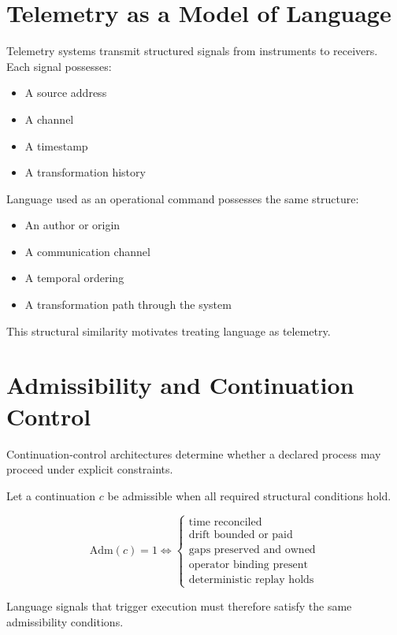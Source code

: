 \documentclass[11pt]{article}
\begin{document}
\section{Telemetry as a Model of Language}

Telemetry systems transmit structured signals from instruments to receivers. 
Each signal possesses:

\begin{itemize}
\item A source address
\item A channel
\item A timestamp
\item A transformation history
\end{itemize}

Language used as an operational command possesses the same structure:

\begin{itemize}
\item An author or origin
\item A communication channel
\item A temporal ordering
\item A transformation path through the system
\end{itemize}

This structural similarity motivates treating language as telemetry.

\section{Admissibility and Continuation Control}

Continuation-control architectures determine whether a declared process may proceed under explicit constraints.

Let a continuation $c$ be admissible when all required structural conditions hold.

\[
\mathrm{Adm}(c) = 1 \iff
\begin{cases}
\text{time reconciled} \\
\text{drift bounded or paid} \\
\text{gaps preserved and owned} \\
\text{operator binding present} \\
\text{deterministic replay holds}
\end{cases}
\]

Language signals that trigger execution must therefore satisfy the same admissibility conditions.
\end{document}
